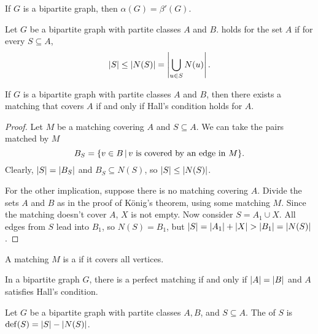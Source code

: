 
\begin{corollary}
  If $G$ is a bipartite graph, then $\alpha(G) = \beta'(G)$.
\end{corollary}

\begin{definition}
  Let $G$ be a bipartite graph with partite classes $A$ and $B$.
   holds for the set $A$ if for every $S \subseteq A$,
  \[
	\left| S \right| \le \left| N(S) \right| = \left|  \bigcup_{u \in S} N(u)  \right|.
  \]
\end{definition}

\begin{theorem}[Hall]
  If $G$ is a bipartite graph with partite classes $A$ and $B$, then there
  exists a matching that covers $A$ if and only if Hall's condition holds for
  $A$.
\end{theorem}

\begin{proof}
  Let $M$ be a matching covering $A$ and $S \subseteq A$.
  We can take the pairs matched by $M$
  \[
	B_S = \{ v \in B \,|\, \text{$v$ is covered by an edge in $M$} \}.
  \]
  Clearly, $\left| S \right| = \left| B_S \right|$ and $B_S \subseteq N(S)$, so $\left| S \right| \le
  \left| N(S) \right|$.

  For the other implication, suppose there is no matching covering $A$.
  Divide the sets $A$ and $B$ as in the proof of König's theorem, using some
  matching $M$.
  Since the matching doesn't cover $A$, $X$ is not empty.
  Now consider $S = A_1 \cup X$.
  All edges from $S$ lead into $B_1$, so $N(S) = B_1$, but $\left| S \right| = \left| A_1 \right|
  + \left| X \right| > \left| B_1 \right| = \left| N(S) \right|$.
\end{proof}


\begin{definition}
  A matching $M$ is a  if it covers all vertices.
\end{definition}

\begin{corollary}
  In a bipartite graph $G$, there is a perfect matching if and only if $\left| A \right|
  = \left| B \right|$ and $A$ satisfies Hall's condition.
\end{corollary}

\begin{definition}
  Let $G$ be a bipartite graph with partite classes $A,B$, and $S \subseteq A$.
  The  of $S$ is $\operatorname{def}(S) = \left| S \right| -
  \left| N(S) \right|$.
\end{definition}

